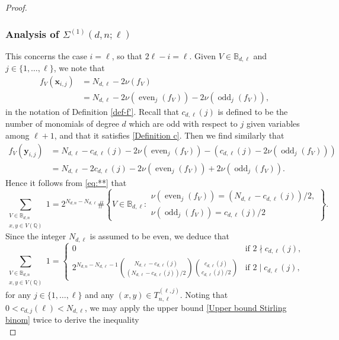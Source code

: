 \documentclass[11pt, reqno]{amsart}
\numberwithin{equation}{section}
\newcommand{\xx}{\mathbf{x}}
\newcommand{\yy}{\mathbf{y}}
\DeclareMathOperator{\even}{even}
\DeclareMathOperator{\odd}{odd}
\begin{document}
\begin{proof}
\subsubsection*{Analysis of $\Sigma^{(1)}(d,n;\ell)$}


This concerns the case $i=\ell$, so that $2\ell-i=\ell$. 
Given $V\in 
 \mathbb{B}_{d,\ell}$ and $j\in \{1,\dots,\ell\}$, we note that
\begin{align*}
f_V(\xx_{i,j})
&=N_{d,\ell}-2\nu(f_V)\\
&=N_{d,\ell}-2\nu(\even_j(f_V))-2\nu(\odd_j(f_V)),
\end{align*}
in the notation of Definition \ref{def-f'}.
Recall that 
 $c_{d,\ell}(j)$ is defined to be the number of monomials of degree $d$ which are odd with respect to $j$ given variables among $\ell+1$, and that it satisfies  \eqref{Definition c}.
Then we find similarly that
 \begin{align*}
f_V(\yy_{i,j})
&=N_{d,\ell}-
c_{d,\ell}(j)-
2\nu(\even_j(f_V))-\left(c_{d,\ell}(j)-2\nu(\odd_j(f_V))\right)\\
&=N_{d,\ell}-
2c_{d,\ell}(j)-
2\nu(\even_j(f_V))+2\nu(\odd_j(f_V)).
\end{align*}
Hence it follows from \eqref{eq:**} that 
$$
\sum_{\substack{V \in \mathbb{B}_{d,n} \\ x, y \in V(\mathbb{Q})}} 1=
2^{N_{d,n}-N_{d,\ell}} 
\#\left\{V \in \mathbb{B}_{d,\ell} : 
\begin{array}{l}
\nu(\even_j(f_V))=(N_{d,\ell}-c_{d,\ell}(j))/2,\\
\nu(\odd_j(f_V))=c_{d,\ell}(j)/2
\end{array}\right\}.
$$
Since the integer $N_{d,\ell}$ is assumed to be even, we deduce that 
\begin{equation*}
\sum_{\substack{V \in \mathbb{B}_{d,n} \\ x, y \in V(\mathbb{Q})}} 1 =
\begin{cases}
0 & \textrm{if } 2 \nmid c_{d,\ell}(j), \\
\displaystyle{2^{N_{d,n}-N_{d,\ell}-1} \binom{N_{d,\ell}-c_{d,\ell}(j)}{(N_{d,\ell}-c_{d,\ell}(j))/2} \binom{c_{d,\ell}(j)}{c_{d,\ell}(j)/2}} & \textrm{if } 2 \mid c_{d,\ell}(j),
\end{cases}
\end{equation*}
for any  $j \in \{1, \dots, \ell\}$ and any $(x, y) \in T_{n,\ell}^{(\ell,j)}$.
Noting that $0<c_{d,j}(\ell)<N_{d,\ell}$, we may
apply the upper bound \eqref{Upper bound Stirling binom}
 twice to  derive the inequality
\begin{equation*}

\end{equation*}
\end{proof}
\end{document}

